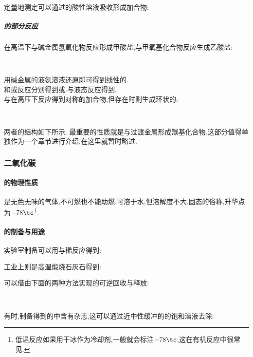 \documentclass[draft]{ctexart}
\begin{document}
\begin{center}
\end{center}
定量地测定可以通过的酸性溶液吸收形成加合物:
\begin{center}
\end{center}
\subparagraph{{}的部分反应}
在高温下与碱金属氢氧化物反应形成甲酸盐,与甲氧基化合物反应生成乙酸盐:
\begin{center}
    \\
\end{center}

\indent {}用碱金属的液氨溶液还原即可得到线性的.\\
\indent {}和或反应分别得到或.与液态反应得到.\\
\indent {}与在高压下反应得到对称的加合物,但存在时则生成环状的:
\begin{center}
    \\
\end{center}
两者的结构如下所示.
最重要的性质就是与过渡金属形成羰基化合物.这部分值得单独作为一个章节进行介绍,在这里就暂时略过.
\subsubsection{二氧化碳}
\paragraph{的物理性质}
是无色无味的气体,不可燃也不能助燃.可溶于水,但溶解度不大.固态的俗称,升华点为$-78\tc$\footnote{低温反应如果用干冰作为冷却剂,一般就会标注$-78\tc$,这在有机反应中很常见.}.
\paragraph{的制备与用途}
实验室制备可以用与稀反应得到:
\begin{center}
\end{center}
工业上则是高温煅烧石灰石得到:
\begin{center}
\end{center}
可以借由下面的两种方法实现的可逆回收与释放:
\begin{center}
    \\
\end{center}
有时,制备得到的中含有杂志,这可以通过近中性缓冲的的饱和溶液去除:
\begin{center}
\end{center}
\end{document}
